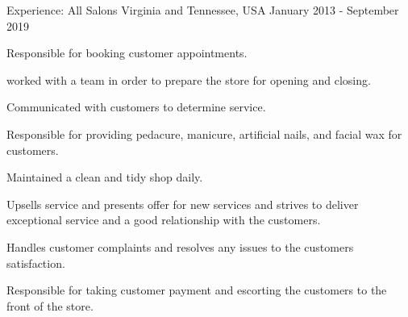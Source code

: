 

\begin{cventries}

  \cventry
  {Experience:}
  {All Salons}
  {Virginia and Tennessee, USA}
  {January 2013 - September 2019}
  {
  \begin{cvitems}
      \item Responsible for booking customer appointments.
      \item worked with a team in order to prepare the store for opening and closing.
      \item Communicated with customers to determine service.
      \item Responsible for providing pedacure, manicure, artificial nails, and facial wax for customers.
      \item Maintained a clean and tidy shop daily.
       \item Upsells service and presents offer for new services and strives to deliver exceptional service and a good relationship with the customers.
      \item Handles customer complaints and resolves any issues to the customers satisfaction.
      \item Responsible for taking customer payment and escorting the customers to the front of the store.
  \end{cvitems}
  }


\end{cventries}
